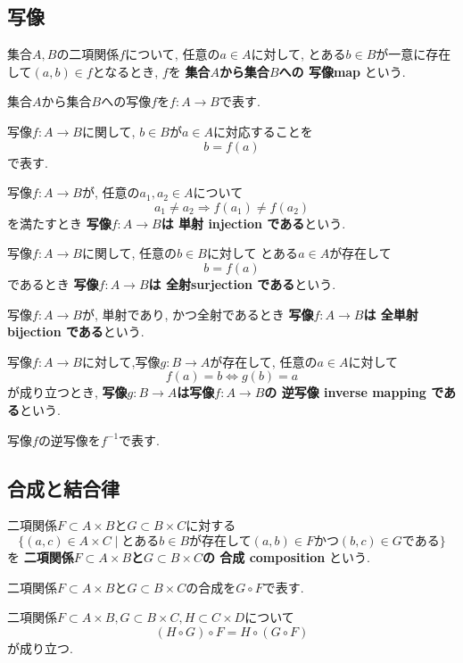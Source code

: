 \subsection{写像}
\begin{Def}
集合$A,B$の二項関係$f$について,
任意の$a\in A$に対して, とある$b\in B$が一意に存在して$(a,b)\in f$となるとき,
$f$を
{\bf 集合$A$から集合$B$への
写像map}
という.
\end{Def}
\begin{Notation}
集合$A$から集合$B$への写像$f$を$f:A\rightarrow B$で表す.
\end{Notation}
\begin{Notation}
写像$f:A\rightarrow B$に関して, $b\in B$が$a\in A$に対応することを
\[
b=f(a)
\]
で表す.
\end{Notation}
\begin{Def}
写像$f:A\rightarrow B$が,
任意の$a_1,a_2\in A$について
\[
a_1\neq a_2\Rightarrow f(a_1)\neq f(a_2)
\]
を満たすとき
{\bf 写像$f:A\rightarrow B$は
単射 injection
である}という.
\end{Def}
\begin{Def}
写像$f:A\rightarrow B$に関して,
任意の$b\in B$に対して
とある$a\in A$が存在して
\[
b=f(a)
\]
であるとき
{\bf 写像$f:A\rightarrow B$は
全射surjection 
である}という.
\end{Def}
\begin{Def}
写像$f:A\rightarrow B$が, 単射であり, かつ全射であるとき
{\bf 写像$f:A\rightarrow B$は
全単射 bijection
である}という.
\end{Def}

\begin{Def}
写像$f:A\rightarrow B$に対して,写像$g:B\rightarrow A$が存在して, 任意の$a\in A$に対して
\[
f(a)=b \Leftrightarrow g(b)=a
\]
が成り立つとき, 
{\bf 写像$g:B\rightarrow A$は写像$f:A\rightarrow B$の
逆写像 inverse mapping
である}という.
\end{Def}
\begin{Notation}
写像$f$の逆写像を$f^{-1}$で表す.
\end{Notation}

\subsection{合成と結合律}
\begin{Def}
二項関係$F\subset A\times B$と$G\subset B\times C$に対する
\[
\{(a,c)\in A\times C\mid \text{とある}b\in B\text{が存在して}(a,b)\in F \text{かつ} (b,c)\in G\text{である}\}
\]
を
{\bf 二項関係$F\subset A\times B$と$G\subset B\times C$の
合成 composition
}という.
\end{Def}
\begin{Notation}
二項関係$F\subset A\times B$と$G\subset B\times C$の合成を$G\circ F$で表す.
\end{Notation}
\begin{Prop}
二項関係$F\subset A\times B ,G\subset B\times C, H\subset C\times D$について
\[
(H\circ G)\circ F=H\circ (G\circ F)
\]
が成り立つ.
\end{Prop}

